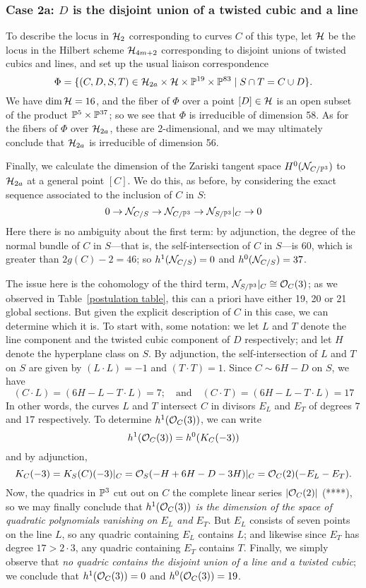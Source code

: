 \subsubsection{Case 2a: $D$ is the disjoint union of a twisted cubic and a line}

To describe the locus in ${\cal H}_2$ corresponding to curves $C$ of this type, let ${\cal H}$ be the locus in the Hilbert scheme ${\cal H}_{4m+2}$ corresponding to disjoint unions of twisted cubics and lines, and set up the usual liaison correspondence
$$
\Phi = \{(C,D,S,T) \in {\cal H}_{2a} \times {\cal H} \times {\mathbb P}^{19} \times {\mathbb P}^{83} \mid S \cap T = C \cup D \}.
$$
We have $\dim {\cal H} = 16$, and the fiber of $\Phi$ over a point $[D] \in {\cal H}$ is an open subset of the product ${\mathbb P}^5 \times {\mathbb P}^{37}$; so we see that $\Phi$ is irreducible of dimension 58. As for the fibers of $\Phi$ over $ {\cal H}_{2a}$, these are 2-dimensional, and we may ultimately conclude that ${\cal H}_{2a}$ is irreducible of dimension 56.

Finally, we calculate the dimension of the Zariski tangent space $H^0({\mathcal N}_{C/{\mathbb P}^3})$ to ${\cal H}_{2a}$ at a general point $[C]$. We do this, as before, by considering the exact sequence associated to the inclusion of $C$ in $S$:
$$
0 \to {\mathcal N}_{C/S} \to {\mathcal N}_{C/{\mathbb P}^3} \to {\mathcal N}_{S/{\mathbb P}^3}|_C \to 0
$$ 
Here there is no ambiguity about the first term: by adjunction, the degree of the normal bundle of $C$ in $S$---that is, the self-intersection of $C$ in $S$---is 60, which is greater than $2g(C) - 2 = 46$; so $h^1({\mathcal N}_{C/S}) = 0$ and $h^0({\mathcal N}_{C/S}) = 37$.

The issue here is the cohomology of the third term, ${\mathcal N}_{S/{\mathbb P}^3}|_C \cong {\mathcal O}_C(3)$; as we observed in Table~\ref{postulation table}, this can a priori have either 19, 20 or 21 global sections. But given the explicit description of $C$ in this case, we can determine which it is. To start with, some notation: we let $L$ and $T$ denote the line component and the twisted cubic component of $D$ respectively; and let $H$ denote the hyperplane class on $S$. By adjunction, the self-intersection of $L$ and $T$ on $S$ are given by $(L \cdot L) = -1$ and $(T \cdot T) = 1$. Since $C \sim 6H - D$ on $S$, we have
$$
(C\cdot L) = (6H - L - T \cdot L) = 7; \quad \text{and} \quad (C\cdot T) = (6H - L - T \cdot L) = 17
$$
In other words, the curves $L$ and $T$ intersect $C$ in divisors $E_L$ and $E_T$ of degrees $7$ and $17$ respectively. To determine $h^1({\mathcal O}_C(3))$, we can write
$$
h^1({\mathcal O}_C(3)) = h^0(K_C(-3)) 
$$
and by adjunction,
$$
K_C(-3) = K_S(C)(-3)|_C = {\mathcal O}_S(-H + 6H - D - 3H)|_C = {\mathcal O}_C(2)(-E_L-E_T).
$$
Now, the quadrics in ${\mathbb P}^3$ cut out on $C$ the complete linear series $|{\mathcal O}_C(2)|$ (****), so we may finally conclude that \emph{$h^1({\mathcal O}_C(3))$ is the dimension of the space of quadratic polynomials vanishing on $E_L$ and $E_T$}. But $E_L$ consists of seven points on the line $L$, so any quadric containing $E_L$ contains $L$; and likewise since $E_T$ has degree $17 > 2\cdot 3$, any quadric containing $E_T$ contains $T$. Finally, we simply observe that \emph{no quadric contains the disjoint union of a line and a twisted cubic}; we conclude that $h^1({\mathcal O}_C(3))=0$ and $h^0({\mathcal O}_C(3)) = 19$.

